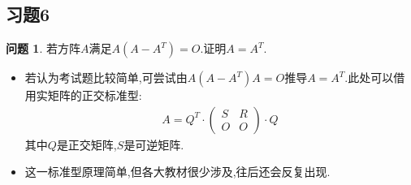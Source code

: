 \documentclass[11pt]{ctexart}
\theoremstyle{definition}
\newtheorem{qqq}{问题}[section]
\numberwithin{equation}{section}
\begin{document}
\subsection{习题6}
\begin{qqq}
    若方阵$A$满足$A(A-A^T)=O$.证明$A=A^T$.
    \begin{itemize}
        \item  若认为考试题比较简单,可尝试由$A(A-A^T)A=O$推导$A=A^T$.此处可以借用实矩阵的正交标准型:\begin{align}
            A=Q^T\cdot \begin{pmatrix}
                S&R\\O&O
            \end{pmatrix}\cdot Q
        \end{align}
        其中$Q$是正交矩阵,$S$是可逆矩阵.
        \item 这一标准型原理简单,但各大教材很少涉及,往后还会反复出现.
    \end{itemize}
\end{qqq}
\end{document}
